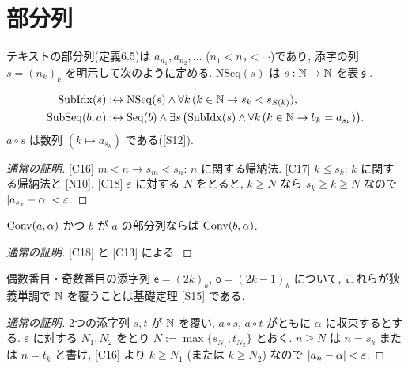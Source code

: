 \section{部分列}

テキストの部分列(定義6.5)は $a_{n_1}, a_{n_2}, \ldots$ ($n_1 < n_2 < \cdots$)であり, 添字の列 $s = (n_k)_k$ を明示して次のように定める. $\mathrm{NSeq}(s)$ は $s : \mathbb{N} \to \mathbb{N}$ を表す.
\begin{dfn}[テキスト定義6.5]
  \begin{align*}
    \mathrm{SubIdx}(s) &:\leftrightarrow \mathrm{NSeq}(s) \land \forall k\,(k \in \mathbb{N} \to s_k < s_{S(k)}),\\
    \mathrm{SubSeq}(b, a) &:\leftrightarrow \mathrm{Seq}(b) \land \exists s\,\bigl(\mathrm{SubIdx}(s) \land \forall k\,(k \in \mathbb{N} \to b_k = a_{s_k})\bigr).
  \end{align*}
  $a \circ s$ は数列 $(k \mapsto a_{s_k})$ である([S12]).
\end{dfn}

\begin{lem}
\end{lem}
\begin{proof}[通常の証明]
  [C16] $m < n \to s_m < s_n$: $n$ に関する帰納法. [C17] $k \leq s_k$: $k$ に関する帰納法と [N10]. [C18] $\varepsilon$ に対する $N$ をとると, $k \geq N$ なら $s_k \geq k \geq N$ なので $\lvert a_{s_k} - \alpha\rvert < \varepsilon$.
\end{proof}

\begin{thm}\label{thm:subconv}
  $\mathrm{Conv}(a, \alpha)$ かつ $b$ が $a$ の部分列ならば $\mathrm{Conv}(b, \alpha)$.
\end{thm}
\begin{proof}[通常の証明]
  [C18] と [C13] による.
\end{proof}

偶数番目・奇数番目の添字列 $\mathsf{e} = (2k)_k$, $\mathsf{o} = (2k-1)_k$ について, これらが狭義単調で $\mathbb{N}$ を覆うことは基礎定理 [S15] である.

\begin{lem}\end{lem}
\begin{proof}[通常の証明]
  2つの添字列 $s, t$ が $\mathbb{N}$ を覆い, $a \circ s$, $a \circ t$ がともに $\alpha$ に収束するとする. $\varepsilon$ に対する $N_1, N_2$ をとり $N := \max\{s_{N_1}, t_{N_2}\}$ とおく. $n \geq N$ は $n = s_k$ または $n = t_k$ と書け, [C16] より $k \geq N_1$ (または $k \geq N_2$) なので $\lvert a_n - \alpha\rvert < \varepsilon$.
\end{proof}

